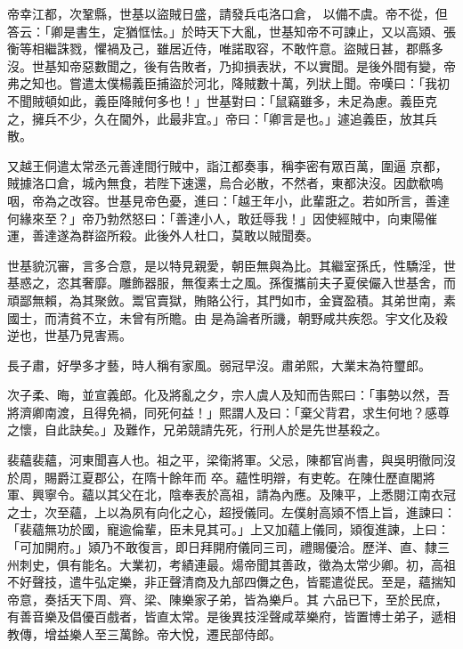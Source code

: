 \begin{pinyinscope}
 帝幸江都，次鞏縣，世基以盜賊日盛，請發兵屯洛口倉，
 以備不虞。帝不從，但答云：「卿是書生，定猶恇怯。」於時天下大亂，世基知帝不可諫止，又以高熲、張衡等相繼誅戮，懼禍及己，雖居近侍，唯諾取容，不敢忤意。盜賊日甚，郡縣多沒。世基知帝惡數聞之，後有告敗者，乃抑損表狀，不以實聞。是後外間有變，帝弗之知也。嘗遣太僕楊義臣捕盜於河北，降賊數十萬，列狀上聞。帝嘆曰：「我初不聞賊頓如此，義臣降賊何多也！」世基對曰：「鼠竊雖多，未足為慮。義臣克之，擁兵不少，久在閫外，此最非宜。」帝曰：「卿言是也。」遽追義臣，放其兵散。



 又越王侗遣太常丞元善達間行賊中，詣江都奏事，稱李密有眾百萬，圍逼
 京都，賊據洛口倉，城內無食，若陛下速還，烏合必散，不然者，東都決沒。因歔欷嗚咽，帝為之改容。世基見帝色憂，進曰：「越王年小，此輩誑之。若如所言，善達何緣來至？」帝乃勃然怒曰：「善達小人，敢廷辱我！」因使經賊中，向東陽催運，善達遂為群盜所殺。此後外人杜口，莫敢以賊聞奏。



 世基貌沉審，言多合意，是以特見親愛，朝臣無與為比。其繼室孫氏，性驕淫，世基惑之，恣其奢靡。雕飾器服，無復素士之風。孫復攜前夫子夏侯儼入世基舍，而頑鄙無賴，為其聚斂。鬻官賣獄，賄賂公行，其門如市，金寶盈積。其弟世南，素國士，而清貧不立，未曾有所贍。由
 是為論者所譏，朝野咸共疾怨。宇文化及殺逆也，世基乃見害焉。



 長子肅，好學多才藝，時人稱有家風。弱冠早沒。肅弟熙，大業末為符璽郎。



 次子柔、晦，並宣義郎。化及將亂之夕，宗人虞人及知而告熙曰：「事勢以然，吾將濟卿南渡，且得免禍，同死何益！」熙謂人及曰：「棄父背君，求生何地？感尊之懷，自此訣矣。」及難作，兄弟競請先死，行刑人於是先世基殺之。



 裴蘊裴蘊，河東聞喜人也。祖之平，梁衛將軍。父忌，陳都官尚書，與吳明徹同沒於周，賜爵江夏郡公，在隋十餘年而
 卒。蘊性明辯，有吏乾。在陳仕歷直閣將軍、興寧令。蘊以其父在北，陰奉表於高祖，請為內應。及陳平，上悉閱江南衣冠之士，次至蘊，上以為夙有向化之心，超授儀同。左僕射高熲不悟上旨，進諫曰：「裴蘊無功於國，寵逾倫輩，臣未見其可。」上又加蘊上儀同，熲復進諫，上曰：「可加開府。」熲乃不敢復言，即日拜開府儀同三司，禮賜優洽。歷洋、直、隸三州刺史，俱有能名。大業初，考績連最。煬帝聞其善政，徵為太常少卿。初，高祖不好聲技，遣牛弘定樂，非正聲清商及九部四儛之色，皆罷遣從民。至是，蘊揣知帝意，奏括天下周、齊、梁、陳樂家子弟，皆為樂戶。其
 六品已下，至於民庶，有善音樂及倡優百戲者，皆直太常。是後異技淫聲咸萃樂府，皆置博士弟子，遞相教傳，增益樂人至三萬餘。帝大悅，遷民部侍郎。




\end{pinyinscope}
